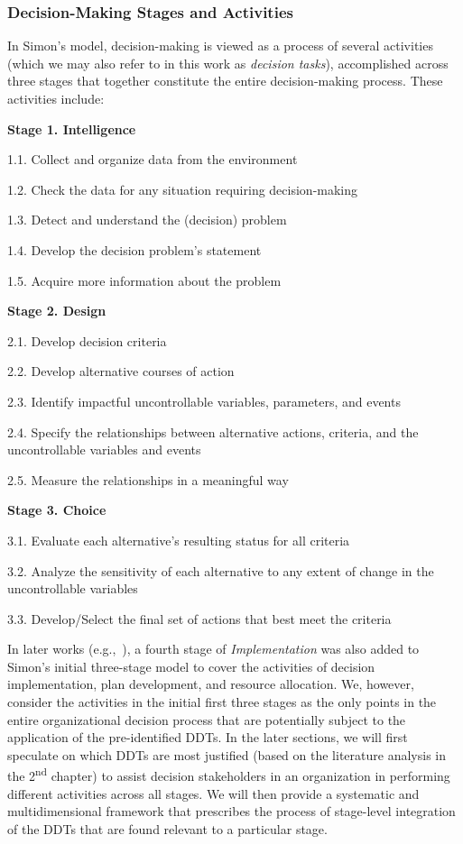 \documentclass{sfuthesis}
\begin{document}
\subsubsection{Decision-Making Stages and Activities}
In Simon’s model, decision-making is viewed as a process of several activities (which we may also refer to in this work as \textit{decision tasks}), accomplished across three stages that together constitute the entire decision-making process. These activities include:\par
\textbf{Stage 1. Intelligence}\par
1.1. Collect and organize data from the environment\par
1.2. Check the data for any situation requiring decision-making\par
1.3. Detect and understand the (decision) problem\par
1.4. Develop the decision problem’s statement ~\cite{phillips2013intelligent}\par
1.5. Acquire more information about the problem ~\cite{phillips2013intelligent}\par
\textbf{Stage 2. Design}\par
2.1. Develop decision criteria ~\cite{phillips2013intelligent}\par
2.2. Develop alternative courses of action ~\cite{phillips2013intelligent}\par
2.3. Identify impactful uncontrollable variables, parameters, and events ~\cite{phillips2013intelligent}\par
2.4. Specify the relationships between alternative actions, criteria, and the uncontrollable variables and events ~\cite{phillips2013intelligent}\par
2.5. Measure the relationships in a meaningful way ~\cite{phillips2013intelligent}\par
\textbf{Stage 3. Choice}\par
3.1. Evaluate each alternative’s resulting status for all criteria 
~\cite{phillips2013intelligent}\par
3.2. Analyze the sensitivity of each alternative to any extent of change in the uncontrollable variables\par
3.3. Develop/Select the final set of actions that best meet the criteria
~\cite{phillips2013intelligent}\par
In later works (e.g.,~\cite{mintzberg1977new}), a fourth stage of \textit{Implementation} was also added to Simon’s initial three-stage model to cover the activities of decision implementation, plan development, and resource allocation. We, however, consider the activities in the initial first three stages as the only points in the entire organizational decision process that are potentially subject to the application of the pre-identified DDTs. In the later sections, we will first speculate on which DDTs are most justified (based on the literature analysis in the 2\textsuperscript{nd} chapter) to assist decision stakeholders in an organization in performing different activities across all stages. We will then provide a systematic and multidimensional framework that prescribes the process of stage-level integration of the DDTs that are found relevant to a particular stage.\par
\end{document}
